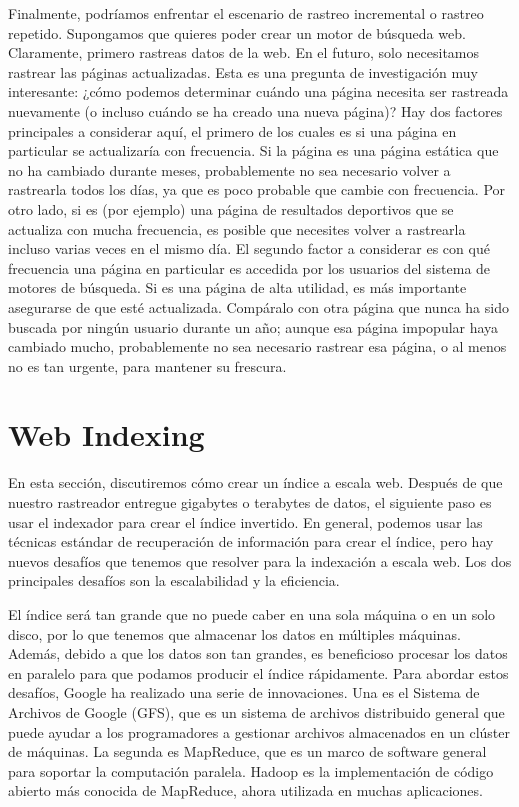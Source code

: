 Finalmente, podríamos enfrentar el escenario de rastreo incremental o rastreo repetido. Supongamos que quieres poder crear un motor de búsqueda web. Claramente, primero rastreas datos de la web. En el futuro, solo necesitamos rastrear las páginas actualizadas. Esta es una pregunta de investigación muy interesante: ¿cómo podemos determinar cuándo una página necesita ser rastreada nuevamente (o incluso cuándo se ha creado una nueva página)? Hay dos factores principales a considerar aquí, el primero de los cuales es si una página en particular se actualizaría con frecuencia. Si la página es una página estática que no ha cambiado durante meses, probablemente no sea necesario volver a rastrearla todos los días, ya que es poco probable que cambie con frecuencia. Por otro lado, si es (por ejemplo) una página de resultados deportivos que se actualiza con mucha frecuencia, es posible que necesites volver a rastrearla incluso varias veces en el mismo día. El segundo factor a considerar es con qué frecuencia una página en particular es accedida por los usuarios del sistema de motores de búsqueda. Si es una página de alta utilidad, es más importante asegurarse de que esté actualizada. Compáralo con otra página que nunca ha sido buscada por ningún usuario durante un año; aunque esa página impopular haya cambiado mucho, probablemente no sea necesario rastrear esa página, o al menos no es tan urgente, para mantener su frescura.

\section{Web Indexing}
En esta sección, discutiremos cómo crear un índice a escala web. Después de que nuestro rastreador entregue gigabytes o terabytes de datos, el siguiente paso es usar el indexador para crear el índice invertido. En general, podemos usar las técnicas estándar de recuperación de información para crear el índice, pero hay nuevos desafíos que tenemos que resolver para la indexación a escala web. Los dos principales desafíos son la escalabilidad y la eficiencia.

El índice será tan grande que no puede caber en una sola máquina o en un solo disco, por lo que tenemos que almacenar los datos en múltiples máquinas. Además, debido a que los datos son tan grandes, es beneficioso procesar los datos en paralelo para que podamos producir el índice rápidamente. Para abordar estos desafíos, Google ha realizado una serie de innovaciones. Una es el Sistema de Archivos de Google (GFS), que es un sistema de archivos distribuido general que puede ayudar a los programadores a gestionar archivos almacenados en un clúster de máquinas. La segunda es MapReduce, que es un marco de software general para soportar la computación paralela. Hadoop es la implementación de código abierto más conocida de MapReduce, ahora utilizada en muchas aplicaciones.

